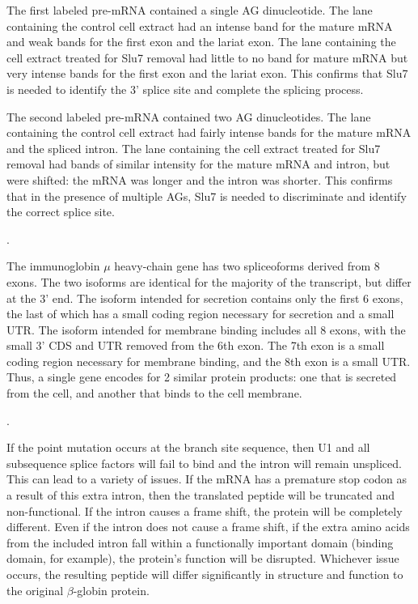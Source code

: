 \documentclass[a4paper, 10pt]{article}
\newcounter{prob_num}
\newcommand{\problem}{\vspace{20pt}\arabic{prob_num}.\stepcounter{prob_num}\par}
\begin{document}
The first labeled pre-mRNA contained a single AG dinucleotide. The lane containing the control cell extract had an intense band for the mature mRNA and weak bands for the first exon and the lariat exon. The lane containing the cell extract treated for Slu7 removal had little to no band for mature mRNA but very intense bands for the first exon and the lariat exon. This confirms that Slu7 is needed to identify the 3' splice site and complete the splicing process.

The second labeled pre-mRNA contained two AG dinucleotides. The lane containing the control cell extract had fairly intense bands for the mature mRNA and the spliced intron. The lane containing the cell extract treated for Slu7 removal had bands of similar intensity for the mature mRNA and intron, but were shifted: the mRNA was longer and the intron was shorter. This confirms that in the presence of multiple AGs, Slu7 is needed to discriminate and identify the correct splice site.


\problem

The immunoglobin $\mu$ heavy-chain gene has two spliceoforms derived from 8 exons. The two isoforms are identical for the majority of the transcript, but differ at the 3' end. The isoform intended for secretion contains only the first 6 exons, the last of which has a small coding region necessary for secretion and a small UTR. The isoform intended for membrane binding includes all 8 exons, with the small 3' CDS and UTR removed from the 6th exon. The 7th exon is a small coding region necessary for membrane binding, and the 8th exon is a small UTR. Thus, a single gene encodes for 2 similar protein products: one that is secreted from the cell, and another that binds to the cell membrane.

\vspace{200px}


\problem

If the point mutation occurs at the branch site sequence, then U1 and all subsequence splice factors will fail to bind and the intron will remain unspliced. This can lead to a variety of issues. If the mRNA has a premature stop codon as a result of this extra intron, then the translated peptide will be truncated and non-functional. If the intron causes a frame shift, the protein will be completely different. Even if the intron does not cause a frame shift, if the extra amino acids from the included intron fall within a functionally important domain (binding domain, for example), the protein's function will be disrupted. Whichever issue occurs, the resulting peptide will differ significantly in structure and function to the original $\beta$-globin protein.
\end{document}
